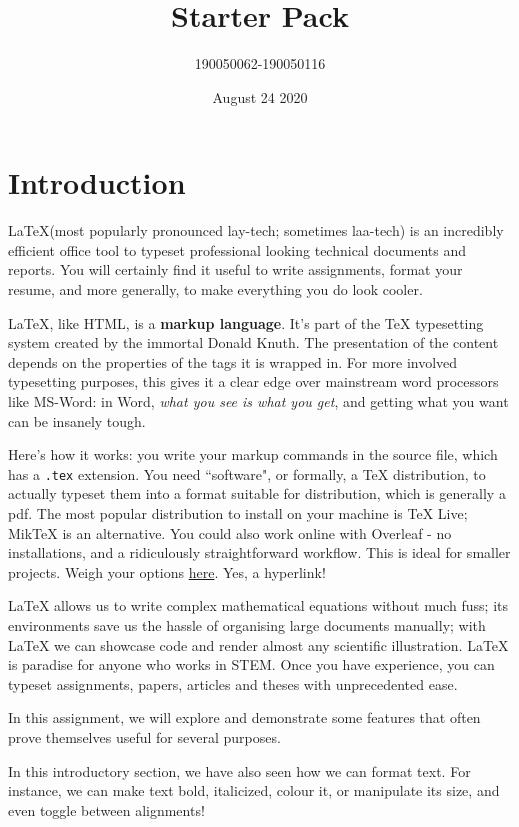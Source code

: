 \documentclass[a4paper]{article}
\title{\latex Starter Pack}
\author{190050062-190050116}
\date{August 24 2020}
\newcommand{\latex}{\LaTeX\xspace}
\newcommand{\tex}{\TeX\xspace}
\begin{document}
\maketitle
\tableofcontents
\thispagestyle{empty}
\setcounter{page}{0}
\newpage

\section{Introduction}
\latex (most popularly pronounced lay-tech; sometimes laa-tech) is an incredibly efficient office tool to typeset professional looking technical documents and reports. You will certainly find it useful to write assignments, format your resume, and more generally, to make everything you do look cooler.\par
\latex, like HTML, is a \textbf{markup language}. It's part of the \tex typesetting system created by the immortal Donald Knuth. The presentation of the content depends on the properties of the tags it is wrapped in. For more involved typesetting purposes, this gives it a clear edge over mainstream word processors like MS-Word: in Word, \textit{what you see is what you get}, and getting what you want can be insanely tough.\par
Here's how it works: you write your markup commands in the source file, which has a \texttt{.tex} extension. You need ``software", or formally, a \tex distribution, to actually typeset them into a format suitable for distribution, which is generally a pdf. The most popular distribution to install on your machine is TeX Live; MikTeX is an alternative. You could also work online with Overleaf - no installations, and a ridiculously straightforward workflow. This is ideal for smaller projects. Weigh your options \href{https://www.latex-project.org/get/}{here}. Yes, a hyperlink!\par
\latex allows us to write complex mathematical equations without much fuss; its environments save us the hassle of organising large documents manually; with \latex we can showcase code and render almost any scientific illustration. \latex is paradise for anyone who works in STEM. Once you have experience, you can typeset assignments, papers, articles and theses with unprecedented ease.\par
In this assignment, we will explore and demonstrate some features that often prove themselves useful for several purposes.\par
\begin{large}
In this introductory section, we have also seen how we can format text. For instance, we can make text bold, italicized, colour it, or manipulate its size, and even toggle between alignments!\par
\end{large}
\end{document}
